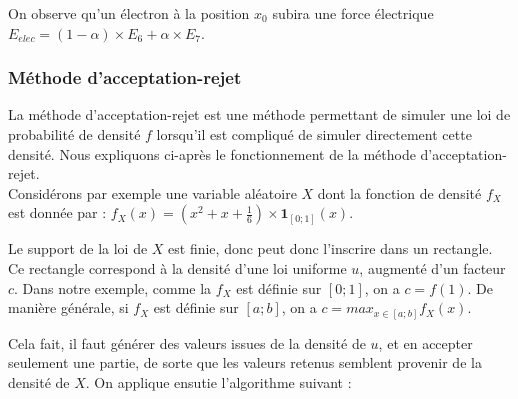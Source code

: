 \documentclass{article}
\begin{document}
On observe qu'un électron à la position $x_0$ subira une force électrique $E_{elec} = (1 - \alpha) \times E_6 + \alpha \times E_7$.
\subsubsection*{Méthode d'acceptation-rejet}
La méthode d'acceptation-rejet est une méthode permettant de simuler une loi de probabilité de densité $f$ lorsqu'il est compliqué de simuler directement cette densité. Nous expliquons ci-après le fonctionnement de la méthode d'acceptation-rejet.\\
Considérons par exemple une variable aléatoire $X$ dont la fonction de densité $f_X$ est donnée par : $f_X(x) = (x^2 + x + \frac{1}{6}) \times \mathbf{1}_{[0;1]}(x)$.
\begin{center}
\end{center}
Le support de la loi de $X$ est finie, donc peut donc l'inscrire dans un rectangle. Ce rectangle correspond à la densité d'une loi uniforme $u$, augmenté d'un facteur $c$. Dans notre exemple, comme la $f_X$ est définie sur $[0;1]$, on a $c = f(1)$. De manière générale, si $f_X$ est définie sur $[a;b]$, on a $c = max_{x \in [a;b]} f_X(x)$.
\begin{center}
\end{center}
Cela fait, il faut générer des valeurs issues de la densité de $u$, et en accepter seulement une partie, de sorte que les valeurs retenus semblent provenir de la densité de $X$. On applique ensutie l'algorithme suivant :
\end{document}
